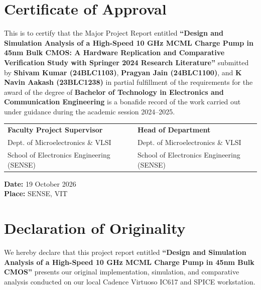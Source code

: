 \documentclass[11pt,a4paper]{report}
\begin{document}
\setcounter{page}{2}

\chapter*{Certificate of Approval}

This is to certify that the Major Project Report entitled \textbf{``Design and Simulation Analysis of a High-Speed 10 GHz MCML Charge Pump in 45nm Bulk CMOS: A Hardware Replication and Comparative Verification Study with Springer 2024 Research Literature''} submitted by \textbf{Shivam Kumar (24BLC1103)}, \textbf{Pragyan Jain (24BLC1100)}, and \textbf{K Navin Aakash (23BLC1238)} in partial fulfillment of the requirements for the award of the degree of \textbf{Bachelor of Technology in Electronics and Communication Engineering} is a bonafide record of the work carried out under guidance during the academic session 2024--2025.

\vspace{2.5cm}
\noindent
\begin{tabularx}{\textwidth}{XrX}
\textbf{Faculty Project Supervisor} & & \textbf{Head of Department} \\
Dept. of Microelectronics \& VLSI & & Dept. of Microelectronics \& VLSI \\
School of Electronics Engineering (SENSE) & & School of Electronics Engineering (SENSE)
\end{tabularx}

\vspace{2.5cm}
\noindent
\textbf{Date:} 19 October 2026 \\
\textbf{Place:} SENSE, VIT

\newpage

\chapter*{Declaration of Originality}

We hereby declare that this project report entitled \textbf{``Design and Simulation Analysis of a High-Speed 10 GHz MCML Charge Pump in 45nm Bulk CMOS''} presents our original implementation, simulation, and comparative analysis conducted on our local Cadence Virtuoso IC617 and SPICE workstation. 
\end{document}
